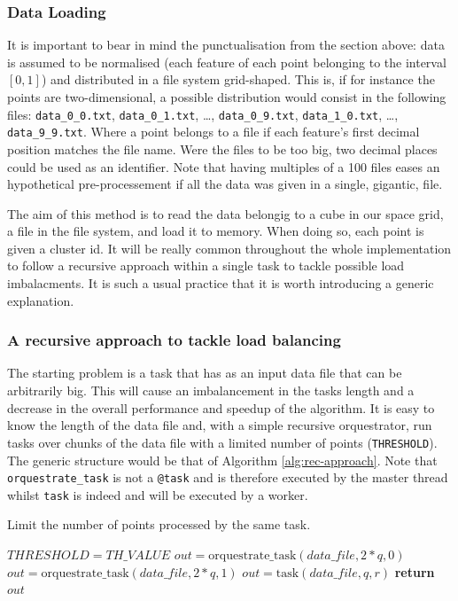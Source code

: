 \documentclass[10pt,journal,compsoc]{IEEEtran}
\let\MYoriglatexcaption\caption
\renewcommand{\caption}[2][\relax]{\MYoriglatexcaption[#2]{#2}}
\begin{document}
\subsubsection{Data Loading} \label{data_pre_process}
It is important to bear in mind the punctualisation from the section above: data is assumed to be normalised (each feature of each point belonging to the interval $[0,1]$) and distributed in a file system grid-shaped. This is, if for instance the points are two-dimensional, a possible distribution would consist in the following files: \texttt{data\_0\_0.txt}, \texttt{data\_0\_1.txt}, \dots, \texttt{data\_0\_9.txt}, \texttt{data\_1\_0.txt}, \dots, \texttt{data\_9\_9.txt}. Where a point belongs to a file if each feature's first decimal position matches the file name. Were the files to be too big, two decimal places could be used as an identifier. Note that having multiples of a 100 files eases an hypothetical pre-processement if all the data was given in a single, gigantic, file.

The aim of this method is to read the data belongig to a cube in our space grid, a file in the file system, and load it to memory. When doing so, each point is given a cluster id. It will be really common throughout the whole implementation to follow a recursive approach within a single task to tackle possible load imbalacments. It is such a usual practice that it is worth introducing a generic explanation.

\subsubsection*{A recursive approach to tackle load balancing} \label{recursive_approach}
The starting problem is a task that has as an input data file that can be arbitrarily big. This will cause an imbalancement in the tasks length and a decrease in the overall performance and speedup of the algorithm. It is easy to know the length of the data file and, with a simple recursive orquestrator, run tasks over chunks of the data file with a limited number of points (\texttt{THRESHOLD}). The generic structure would be that of Algorithm \ref{alg:rec-approach}. Note that \texttt{orquestrate\_task} is not a \texttt{@task} and is therefore executed by the master thread whilst \texttt{task} is indeed and will be executed by a worker.

\begin{algorithm}
  \caption{Limit the number of points processed by the same task. \label{alg:rec-approach}}
  \begin{algorithmic}[1]
        \State $THRESHOLD = TH\_VALUE$
                \State $out = \text{orquestrate\_task}(data\_file, 2*q, 0)$
                \State $out = \text{orquestrate\_task}(data\_file, 2*q, 1)$
            \Else
                \State $out = \text{task}(data\_file, q, r)$
            \EndIf
        \State \textbf{return} $out$
    \EndFunction
  \end{algorithmic}
\end{algorithm}
\end{document}
